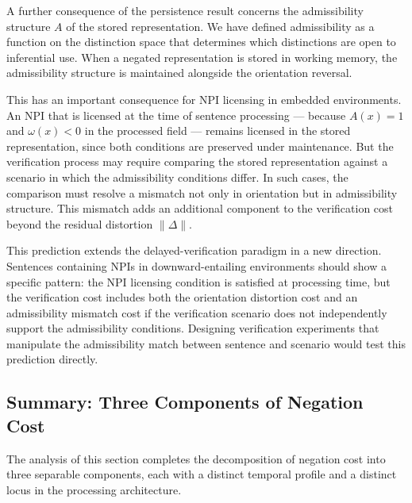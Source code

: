 \documentclass[12pt]{article}
\theoremstyle{remark}
\begin{document}
A further consequence of the persistence result concerns the
admissibility structure $A$ of the stored representation. We have
defined admissibility as a function on the distinction space that
determines which distinctions are open to inferential use. When a
negated representation is stored in working memory, the admissibility
structure is maintained alongside the orientation reversal.

This has an important consequence for NPI licensing in embedded
environments. An NPI that is licensed at the time of sentence processing
--- because $A(x) = 1$ and $\omega(x) < 0$ in the processed field ---
remains licensed in the stored representation, since both conditions are
preserved under maintenance. But the verification process may require
comparing the stored representation against a scenario in which the
admissibility conditions differ. In such cases, the comparison must
resolve a mismatch not only in orientation but in admissibility
structure. This mismatch adds an additional component to the verification
cost beyond the residual distortion $\|\Delta\|$.

This prediction extends the delayed-verification paradigm in a new
direction. Sentences containing NPIs in downward-entailing environments
should show a specific pattern: the NPI licensing condition is satisfied
at processing time, but the verification cost includes both the
orientation distortion cost and an admissibility mismatch cost if the
verification scenario does not independently support the admissibility
conditions. Designing verification experiments that manipulate the
admissibility match between sentence and scenario would test this
prediction directly.

\subsection{Summary: Three Components of Negation Cost}

The analysis of this section completes the decomposition of negation cost
into three separable components, each with a distinct temporal profile
and a distinct locus in the processing architecture.
\end{document}
